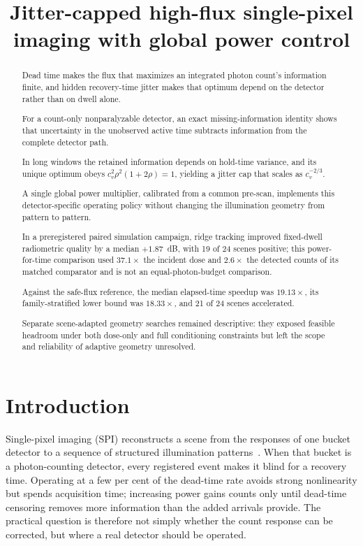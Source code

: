 \documentclass[10pt,twocolumn]{article}
\title{Jitter-capped high-flux single-pixel imaging with global power control}
\author{\SPH{author block --- user decision}}
\date{}
\begin{document}
\maketitle

\begin{abstract}
Dead time makes the flux that maximizes an integrated photon count's
information finite, and hidden recovery-time jitter makes that optimum depend
on the detector rather than on dwell alone.

For a count-only nonparalyzable detector, an exact missing-information identity
shows that uncertainty in the unobserved active time subtracts information from
the complete detector path.

In long windows the retained information depends on hold-time variance, and its
unique optimum obeys $c_v^{2}\rho^{2}(1+2\rho)=1$, yielding a jitter cap that
scales as $c_v^{-2/3}$.

A single global power multiplier, calibrated from a common pre-scan, implements
this detector-specific operating policy without changing the illumination
geometry from pattern to pattern.

In a preregistered paired simulation campaign, ridge tracking improved
fixed-dwell radiometric quality by a median $+1.87$~dB, with 19 of 24 scenes
positive; this power-for-time comparison used $37.1\times$ the incident dose
and $2.6\times$ the detected counts of its matched comparator and is not an
equal-photon-budget comparison.

Against the safe-flux reference, the median elapsed-time speedup was
$19.13\times$, its family-stratified lower bound was $18.33\times$, and 21 of
24 scenes accelerated.

Separate scene-adapted geometry searches remained descriptive: they exposed
feasible headroom under both dose-only and full conditioning constraints but
left the scope and reliability of adaptive geometry unresolved.
\end{abstract}

\section{Introduction}
\label{sec:intro}
Single-pixel imaging (SPI) reconstructs a scene from the responses of one
bucket detector to a sequence of structured illumination
patterns~\cite{duarte2008singlepixel,shapiro2008computational,edgar2019principles}.
When that bucket is a photon-counting detector, every registered event makes it
blind for a recovery time. Operating at a few per cent of the dead-time rate
avoids strong nonlinearity but spends acquisition time; increasing power gains
counts only until dead-time censoring removes more information than the added
arrivals provide. The practical question is therefore not simply whether the
count response can be corrected, but where a real detector should be operated.
\end{document}
